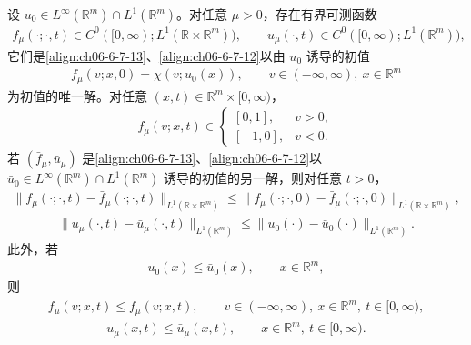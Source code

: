 \documentclass[../../main.tex]{subfiles}
\begin{document}
\begin{theorem}\label{theorem:ch06-6-7-3}
设 $u_{0}\in L^{\infty}(\mathbb{R}^{m})\cap L^{1}(\mathbb{R}^{m})$。对任意 $\mu>0$，存在有界可测函数
\begin{align}
f_{\mu}(\cdot;\cdot,t)\in C^{0}([0,\infty);L^{1}(\mathbb{R}\times\mathbb{R}^{m})),\qquad
u_{\mu}(\cdot,t)\in C^{0}([0,\infty);L^{1}(\mathbb{R}^{m})),
\label{align:ch06-6-7-14}
\end{align}
它们是\eqref{align:ch06-6-7-13}、\eqref{align:ch06-6-7-12}以由 $u_{0}$ 诱导的初值
\begin{align}
f_{\mu}(v;x,0)=\chi(v;u_{0}(x)),\qquad v\in(-\infty,\infty),\ x\in\mathbb{R}^{m}
\label{align:ch06-6-7-15}
\end{align}
为初值的唯一解。对任意 $(x,t)\in\mathbb{R}^{m}\times[0,\infty)$，
\begin{align}
f_{\mu}(v;x,t)\in
\begin{cases}
[0,1], & v>0,\\
[-1,0], & v<0.
\end{cases}
\label{align:ch06-6-7-16}
\end{align}
若 $(\bar{f}_{\mu},\bar{u}_{\mu})$ 是\eqref{align:ch06-6-7-13}、\eqref{align:ch06-6-7-12}以 $\bar{u}_{0}\in L^{\infty}(\mathbb{R}^{m})\cap L^{1}(\mathbb{R}^{m})$ 诱导的初值的另一解，则对任意 $t>0$，
\begin{align}
\|f_{\mu}(\cdot;\cdot,t)-\bar{f}_{\mu}(\cdot;\cdot,t)\|_{L^{1}(\mathbb{R}\times\mathbb{R}^{m})}\leqslant\|f_{\mu}(\cdot;\cdot,0)-\bar{f}_{\mu}(\cdot;\cdot,0)\|_{L^{1}(\mathbb{R}\times\mathbb{R}^{m})},
\label{align:ch06-6-7-17}
\end{align}
\begin{align}
\|u_{\mu}(\cdot,t)-\bar{u}_{\mu}(\cdot,t)\|_{L^{1}(\mathbb{R}^{m})}\leqslant\|u_{0}(\cdot)-\bar{u}_{0}(\cdot)\|_{L^{1}(\mathbb{R}^{m})}.
\label{align:ch06-6-7-18}
\end{align}
此外，若
\begin{align}
u_{0}(x)\leqslant\bar{u}_{0}(x),\qquad x\in\mathbb{R}^{m},
\label{align:ch06-6-7-19}
\end{align}
则
\begin{align}
f_{\mu}(v;x,t)\leqslant\bar{f}_{\mu}(v;x,t),\qquad v\in(-\infty,\infty),\ x\in\mathbb{R}^{m},\ t\in[0,\infty),
\label{align:ch06-6-7-20}
\end{align}
\begin{align}
u_{\mu}(x,t)\leqslant\bar{u}_{\mu}(x,t),\qquad x\in\mathbb{R}^{m},\ t\in[0,\infty).
\label{align:ch06-6-7-21}
\end{align}
\end{theorem}
\end{document}
